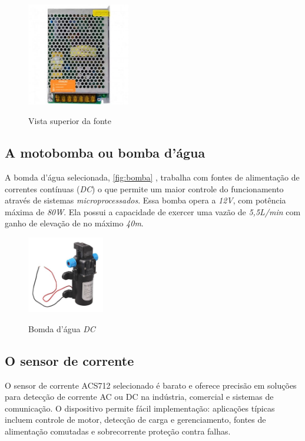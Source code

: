 \begin{figure}[H]
	\centering
	\caption{Vista superior da fonte}
	\includegraphics[width=0.4\textwidth]{figuras/fonte_chaveada.jpg}
	\label{fig:fontechaveada}
\end{figure} 

\subsection{A motobomba ou bomba d'água}

A bomda d'água selecionada, \autoref{fig:bomba} , trabalha com fontes de alimentação de correntes contínuas (\textit{DC}) o que permite um maior controle do funcionamento através de sistemas \textit{microprocessados}. Essa bomba opera a \textit{12V}, com potência máxima de \textit{80W}. Ela possui a capacidade de exercer uma vazão de \textit{5,5L/min} com ganho de elevação de no máximo \textit{40m}.

\begin{figure}[H]
	\centering
	\caption{Bomda d'água \textit{DC}}
	\includegraphics[width=0.3\textwidth]{figuras/bomba.jpeg}
	\label{fig:bomba}
\end{figure} 


\subsection{O sensor de corrente}

O sensor de corrente ACS712 selecionado é barato e oferece precisão em
soluções para detecção de corrente AC ou DC na indústria,
comercial e sistemas de comunicação. O dispositivo permite fácil implementação: aplicações típicas incluem controle de motor, detecção de carga e
gerenciamento, fontes de alimentação comutadas e sobrecorrente
proteção contra falhas.


